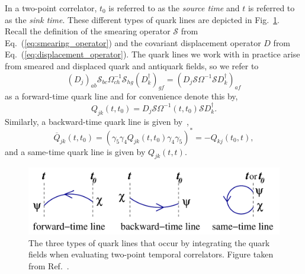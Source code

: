 In a two-point correlator, $t_0$ is referred to as the \emph{source time} and $t$ is referred to as the \emph{sink time}. These different types of quark lines are depicted in Fig.~\ref{fig:quark_lines}. Recall the definition of the smearing operator $\mathcal S$ from Eq.~(\ref{eq:smearing_operator}) and the covariant displacement operator $D$ from Eq.~(\ref{eq:displacement_operator}). The quark lines we work with in practice arise from smeared and displaced quark and antiquark fields, so we refer to
\begin{equation}
    (D_{j})_{a b} \mathcal{S}_{b c} \Omega_{c h}^{-1} \mathcal{S}_{h g}(D_{k}^{\dagger})_{g f}=(D_{j} \mathcal{S} \Omega^{-1} \mathcal{S} D_{k}^{\dagger})_{a f}
\end{equation}
as a forward-time quark line and for convenience denote this by,
\begin{equation}
    Q_{j k}\left(t, t_{0}\right)=D_{j} \mathcal{S} \Omega^{-1}\left(t, t_{0}\right) \mathcal{S} D_{k}^{\dagger}.
\end{equation}
Similarly, a backward-time quark line is given by~\cite{spectroscopy},
\begin{equation}
    \overline{Q}_{j k}\left(t, t_{0}\right)=\left(\gamma_{5} \gamma_{4} Q_{j k}\left(t, t_{0}\right) \gamma_{4} \gamma_{5}\right)^{*} = -Q_{kj}(t_0,t),
\end{equation}
and a same-time quark line is given by $Q_{jk}(t,t)$. 
\begin{figure}
    \centering
    \includegraphics[width=6in]{figures/quarklines.pdf}
    \caption{The three types of quark lines that occur by integrating the quark fields when evaluating two-point temporal correlators. Figure taken from Ref.~\cite{spectroscopy}.}
    \label{fig:quark_lines}
\end{figure}
